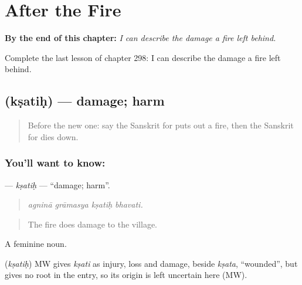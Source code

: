 
\chapter{After the Fire}
\label{ch:sa-after-the-fire}

\begin{chapteropening}
\textbf{By the end of this chapter:} \emph{I can describe the damage a fire left behind.}

Complete the last lesson of chapter 298: I can describe the damage a fire left behind.
\end{chapteropening}

\section[\texorpdfstring{\sk{क्षतिः} (kṣatiḥ)}{क्षतिः (kṣatiḥ)}]{ (kṣatiḥ) — damage; harm}

\label{lesson:SA-C298-ksatih}



\begin{quote}
Before the new one: say the Sanskrit for puts out a fire, then the Sanskrit for dies down.
\end{quote}

\subsection*{You'll want to know: }
\textbf{} — \emph{kṣatiḥ} — \textquotedblleft{}damage; harm\textquotedblright{}.

\begin{quote}
   
\end{quote}

\begin{quote}
\emph{agninā grāmasya kṣatiḥ bhavati.}
\end{quote}

\begin{quote}
The fire does damage to the village.
\end{quote}

A feminine noun.

\begin{cousinweb}
\textbf{} (\emph{kṣatiḥ}) MW gives \emph{kṣati} as injury, loss and damage, beside \emph{kṣata}, \textquotedblleft{}wounded\textquotedblright{}, but gives no root in the entry, so its origin is left uncertain here (MW).
\end{cousinweb}

